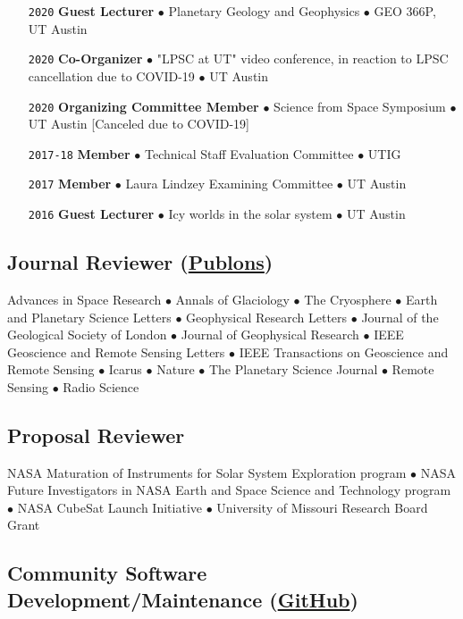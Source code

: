 \begin{itemize}[leftmargin=5.8em, labelsep=1.5em]
    \item[\texttt{2020}] \textbf{Guest Lecturer} $\bullet$ Planetary Geology and Geophysics $\bullet$  GEO 366P, UT Austin
    \item[\texttt{2020}] \textbf{Co-Organizer} $\bullet$ "LPSC at UT" video conference, in reaction to LPSC cancellation due to COVID-19 $\bullet$ UT Austin
    \item[\texttt{2020}] \textbf{Organizing Committee Member} $\bullet$ Science from Space Symposium $\bullet$ UT Austin [Canceled due to COVID-19]
    \item[\texttt{2017-18}] \textbf{Member} $\bullet$ Technical Staff Evaluation Committee $\bullet$ UTIG
    \item[\texttt{2017}] \textbf{Member} $\bullet$ Laura Lindzey Examining Committee $\bullet$ UT Austin
    \item[\texttt{2016}] \textbf{Guest Lecturer} $\bullet$ Icy worlds in the solar system $\bullet$ UT Austin
\end{itemize}

\vspace{-2em}
\subsection*{Journal Reviewer (\href{https://publons.com/author/1177202/cyril-grima\#profile}{Publons})}

Advances in Space Research $\bullet$ Annals of Glaciology $\bullet$ The Cryosphere $\bullet$ Earth and Planetary Science Letters $\bullet$ Geophysical Research Letters $\bullet$ Journal of the Geological Society of London $\bullet$ Journal of Geophysical Research $\bullet$ IEEE Geoscience and Remote Sensing Letters $\bullet$ IEEE Transactions on Geoscience and Remote Sensing $\bullet$ Icarus $\bullet$ Nature $\bullet$ The Planetary Science Journal $\bullet$ Remote Sensing $\bullet$ Radio Science

\vspace{-1em}
\subsection*{Proposal Reviewer}
NASA Maturation of Instruments for Solar System Exploration program $\bullet$ NASA Future Investigators in NASA Earth and Space Science and Technology program $\bullet$ NASA CubeSat Launch Initiative $\bullet$ University of Missouri Research Board Grant

\vspace{-1em}
\subsection*{Community Software Development/Maintenance (\href{https://github.com/cgrima}{GitHub})}
\vspace{-.5em}

